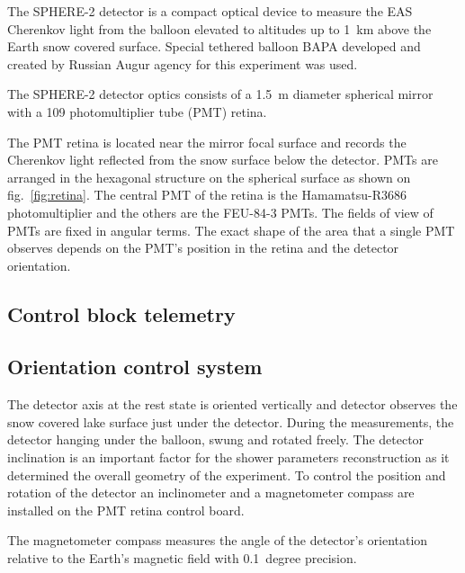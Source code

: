 \documentclass[final,5p,times,twocolumn]{elsarticle}
\begin{document}
The \mbox{SPHERE-2} detector is a compact optical device to measure the EAS Cherenkov light from the balloon elevated to altitudes up to 1~km above the Earth snow covered surface. Special tethered balloon BAPA developed and created by Russian Augur agency for this experiment was used.

The \mbox{SPHERE-2} detector optics consists of a 1.5~m diameter spherical mirror with a 109 photomultiplier tube (PMT) retina. 

The PMT retina is located near the mirror focal surface and records the Cherenkov light reflected from the snow surface below the detector. PMTs are arranged in the hexagonal structure on the spherical surface as shown on fig.~\ref{fig:retina}. The central PMT of the retina is the Hamamatsu-R3686 photomultiplier and the others are the FEU-84-3 PMTs. The fields of view of PMTs are fixed in angular terms. The exact shape of the area that a single PMT observes depends on the PMT's position in the retina and the detector orientation.

\subsection{Control block telemetry}

\subsection{Orientation control system}

The detector axis at the rest state is oriented vertically and detector observes the snow covered lake surface just under the detector. During the measurements, the detector hanging under the balloon, swung and rotated freely. The detector inclination is an important factor for the shower parameters reconstruction as it determined the overall geometry of the experiment. To control the position and rotation of the detector an inclinometer and a magnetometer compass are installed on the PMT retina control board. 

The magnetometer compass measures the angle of the detector's orientation relative to the Earth's magnetic field with 0.1~degree precision.
\end{document}
